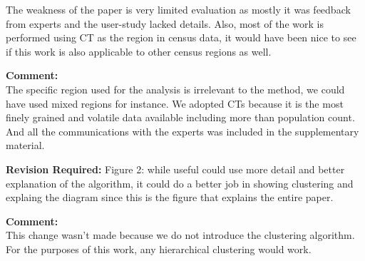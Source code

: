 \documentclass{article}
\newcommand{\reply}[1]{\begin{tcolorbox}\noindent\textbf{Comment:}\\#1\hfill\end{tcolorbox}}
\begin{document}
\begin{itemize}
{    The weakness of the paper is very limited evaluation as mostly it was feedback
    from experts and the user-study lacked details. Also, most of the work is
    performed using CT as the region in census data, it would have been nice to see if
    this work is also applicable to other census regions as well.

    \reply{The specific region used for the analysis is irrelevant to the
    method, we could have used mixed regions for instance. We adopted CTs
    because it is the most finely grained and volatile data available including
    more than population count. And all the communications with the experts was
    included in the supplementary material.}

    \textbf{Revision Required:}
    Figure 2: while useful could use more detail and better explanation of the
    algorithm, it could do a better job in showing clustering and explaing the diagram
    since this is the figure that explains the entire paper.

    \reply{This change wasn't made because we do not introduce the clustering
    algorithm. For the purposes of this work, any hierarchical clustering would
    work.}}
\end{itemize}
\end{document}
